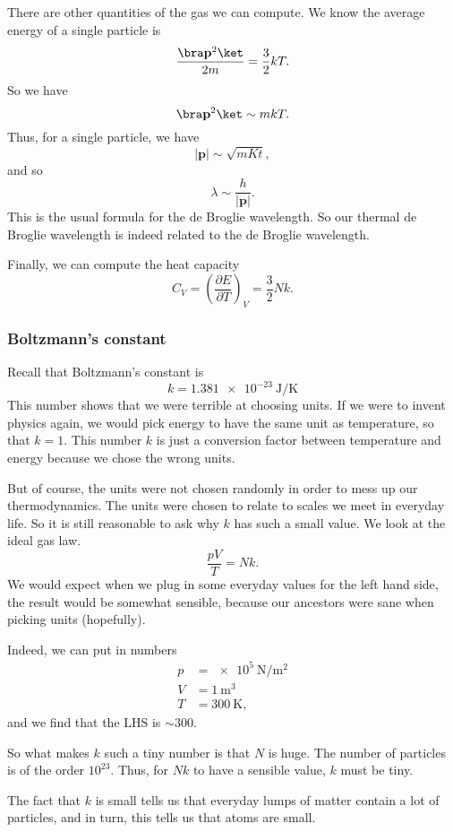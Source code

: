 \documentclass[a4paper]{article}
\begin{document}
There are other quantities of the gas we can compute. We know the average energy of a single particle is
\[
  \frac{\bra \mathbf{p}^2\ket}{2m} = \frac{3}{2} kT.
\]
So we have
\[
  \bra \mathbf{p}^2 \ket \sim mkT.
\]
Thus, for a single particle, we have
\[
  |\mathbf{p}| \sim \sqrt{mKt},
\]
and so
\[
  \lambda \sim \frac{h}{|\mathbf{p}|}.
\]
This is the usual formula for the de Broglie wavelength. So our thermal de Broglie wavelength is indeed related to the de Broglie wavelength.

Finally, we can compute the heat capacity
\[
  C_V = \left(\frac{\partial E}{\partial T}\right)_V = \frac{3}{2}Nk.
\]
\subsubsection*{Boltzmann's constant}
Recall that Boltzmann's constant is
\[
  k = \SI{1.381e-23}{\joule\per\kelvin}
\]
This number shows that we were terrible at choosing units. If we were to invent physics again, we would pick energy to have the same unit as temperature, so that $k = 1$. This number $k$ is just a conversion factor between temperature and energy because we chose the wrong units.

But of course, the units were not chosen randomly in order to mess up our thermodynamics. The units were chosen to relate to scales we meet in everyday life. So it is still reasonable to ask why $k$ has such a small value. We look at the ideal gas law.
\[
  \frac{pV}{T} = Nk.
\]
We would expect when we plug in some everyday values for the left hand side, the result would be somewhat sensible, because our ancestors were sane when picking units (hopefully).

Indeed, we can put in numbers
\begin{align*}
  p &= \SI{e5}{\newton\per\meter\squared}\\
  V &= \SI{1}{\meter\cubed}\\
  T &= \SI{300}{\kelvin},
\end{align*}
and we find that the LHS is $\sim 300$.

So what makes $k$ such a tiny number is that $N$ is huge. The number of particles is of the order $10^{23}$. Thus, for $Nk$ to have a sensible value, $k$ must be tiny.

The fact that $k$ is small tells us that everyday lumps of matter contain a lot of particles, and in turn, this tells us that atoms are small.
\end{document}
